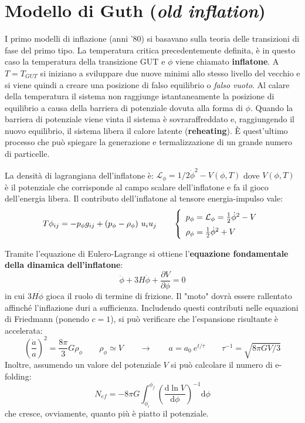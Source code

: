\section{Modello di Guth (\textit{old inflation})}
I primo modelli di inflazione (anni '80) si basavano sulla teoria delle transizioni di fase del primo tipo. La temperatura critica precedentemente definita, è in questo caso la temperatura della transizione GUT e $\phi$ viene chiamato \textbf{inflatone}. A $T=T_{GUT}$ si iniziano a sviluppare due nuove minimi allo stesso livello del vecchio e si viene quindi a creare una posizione di falso equilibrio o \textit{falso vuoto}. Al calare della temperatura il sistema non raggiunge istantaneamente la posizione di equilibrio a causa della barriera di potenziale dovuta alla forma di $\phi$. Quando la barriera di potenziale viene vinta il sistema è sovraraffreddato e, raggiungendo il nuovo equilibrio, il sistema libera il calore latente (\textbf{reheating}). È quest'ultimo processo che può spiegare la generazione e termalizzazione di un grande numero di particelle.

La densità di lagrangiana dell'inflatone è: $\mathcal{L}_\phi = 1/2 \dot{\phi}^2-V(\phi, T)$ dove $V(\phi, T)$ è il potenziale che corrisponde al campo scalare dell'inflatone e fa il gioco dell'energia libera. Il contributo dell'inflatone al tensore energia-impulso vale:
\begin{equation*}
    T \phi_{ij}=-p_\phi g_{ij}+(p_\phi -\rho_\phi)~u_i u_j \qquad \left\{
        \def\arraystretch{1.5}
            \begin{array}{ll}
                p_\phi = \mathcal{L}_\phi = \frac{1}{2}\dot{\phi}^2-V \\
                \rho_\phi = \frac{1}{2}\dot{\phi}^2+V 
        \end{array}\right.
\end{equation*}

Tramite l'equazione di Eulero-Lagrange si ottiene l'\textbf{equazione fondamentale della dinamica dell'inflatone}:
\begin{equation}
    \ddot{\phi} + 3H \dot{\phi} + \frac{\partial V}{\partial \phi} =0
\end{equation}
in cui $3H\dot{\phi}$ gioca il ruolo di termine di frizione. Il "moto" dovrà essere rallentato affinché l'inflazione duri a sufficienza. Includendo questi contributi nelle equazioni di Friedmann (ponendo $c=1$), si può verificare che l'espansione risultante è accelerata:
\begin{equation*}
\left( \frac{\dot{a}}{a}\right)^2 = \frac{8\pi}{3}G\rho_\phi \qquad \rho_\phi \simeq V \qquad \rightarrow \qquad a=a_0 ~e^{t/\tau} \qquad \tau^{-1} = \sqrt{8\pi G V /3}
\end{equation*}
Inoltre, assumendo un valore del potenziale $V$ si può calcolare il numero di e-folding:
\begin{equation*}
N_{ef} = -8\pi G \int_{\phi_i}^{\phi_f} \left(\frac{\mathrm{d} \ln V}{\mathrm{d}\phi}\right)^{-1}\mathrm{d}\phi
\end{equation*}
che cresce, ovviamente, quanto più è piatto il potenziale. 

